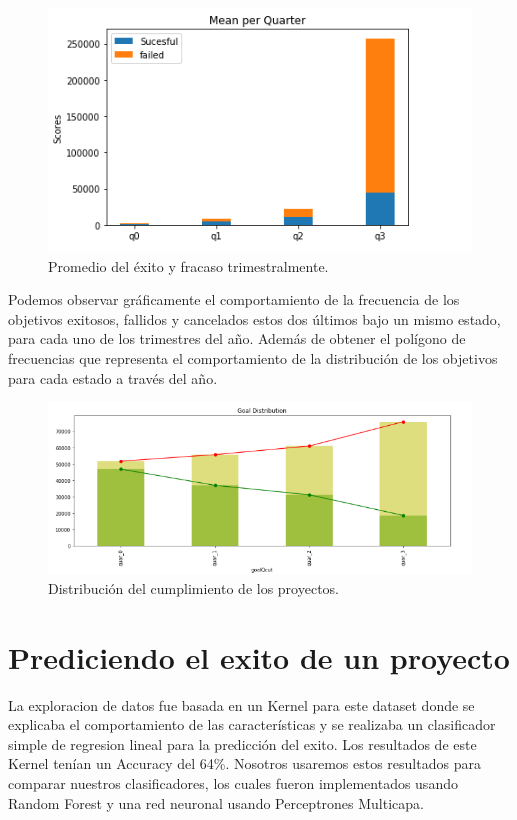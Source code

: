 \documentclass[journal]{IEEEtran}
\begin{document}
\begin{figure}[H]
    \centering
    \captionsetup{justification=centering}
\includegraphics[width=\linewidth]{Images/MeanPerQuarter.png}
    \caption{Promedio del éxito y fracaso trimestralmente. }
\end{figure}


Podemos observar gráficamente el comportamiento de la frecuencia de los objetivos exitosos, fallidos y cancelados estos dos últimos bajo un mismo  estado, para cada uno de los trimestres del año. Además de obtener el polígono de frecuencias que representa el comportamiento de la distribución de los objetivos para cada estado a través del año.


\begin{figure}[H]
    \centering
    \captionsetup{justification=centering}
\includegraphics[width=\linewidth]{Images/GoalDistribution.png}
    \caption{Distribución del cumplimiento de los proyectos. }
\end{figure}




\section{Prediciendo el exito de un proyecto}
La exploracion de datos fue basada en un Kernel para este dataset donde se explicaba el comportamiento de las características y se realizaba un clasificador simple de regresion lineal para la predicción del exito. Los resultados de este Kernel tenían un Accuracy del 64\%. Nosotros usaremos estos resultados para comparar nuestros clasificadores, los cuales fueron implementados usando Random Forest y una red neuronal usando Perceptrones Multicapa.
\end{document}
